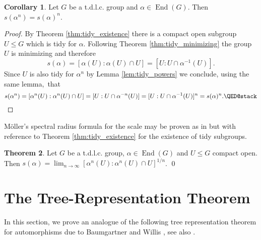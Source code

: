 \documentclass{article}
\DeclareMathOperator\End{End}
\theoremstyle{definition}
\newtheorem{theorem}{Theorem}[section]
\newtheorem{corollary}[theorem]{Corollary}
\begin{document}
\begin{corollary}\label{cor:scale_powers}
Let $G$ be a t.d.l.c. group and $\alpha\in\End(G)$. Then $s(\alpha^{n})=s(\alpha)^{n}$.
\end{corollary}

\begin{proof}
By Theorem \ref{thm:tidy_existence} there is a compact open subgroup $U\le G$ which is tidy for $\alpha$. Following Theorem \ref{thm:tidy_minimizing} the group $U$ is minimizing and therefore
\begin{displaymath}
 s(\alpha)=[\alpha(U):\alpha(U)\cap U]=[U:U\cap\alpha^{-1}(U)].
\end{displaymath}
Since $U$ is also tidy for $\alpha^{n}$ by Lemma \ref{lem:tidy_powers} we conclude, using the same lemma,~that
\begin{displaymath}
 s(\alpha^{n})=[\alpha^{n}(U):\alpha^{n}(U)\cap U]=[U:U\cap\alpha^{-n}(U)]=[U:U\cap\alpha^{-1}(U)]^{n}=s(\alpha)^{n}. \qedhere
\end{displaymath}
\end{proof}

M{\"o}ller's spectral radius formula \cite[Theorem 7.7]{Moe02} for the scale may be proven as in \cite[Proposition 18]{Wil15} but with reference to Theorem \ref{thm:tidy_existence} for the existence of tidy subgroups.

\begin{theorem}
Let $G$ be a t.d.l.c. group, $\alpha\in\End(G)$ and $U\le G$ compact open. Then $s(\alpha)=\lim_{n\to\infty}[\alpha^{n}(U):\alpha^{n}(U)\cap U]^{1/n}$. \qed
\end{theorem}


\section{The Tree-Representation Theorem}\label{sec:tree_rep_thm}

In this section, we prove an analogue of the following tree representation theorem for automorphisms due to Baumgartner and Willis \cite{BW04}, see also \cite{Hor15}.
\end{document}
